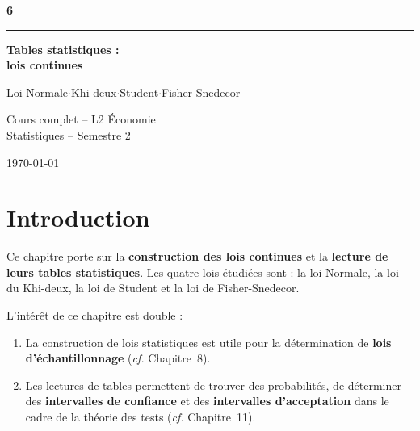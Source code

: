 \documentclass[11pt,a4paper]{article}
\begin{document}
\thispagestyle{empty}
\begin{center}
\vspace*{4cm}

{\fontsize{72}{80}\selectfont\sffamily\bfseries\color{deepblue}6}

\vspace{0.5cm}
{\color{lightblue}\rule{8cm}{2pt}}
\vspace{0.6cm}

{\LARGE\sffamily\bfseries\color{deepblue}Tables statistiques :}\\[0.3cm]
{\LARGE\sffamily\bfseries\color{deepblue}lois continues}

\vspace{1.5cm}

{\large\sffamily\color{textlight}%
Loi Normale\quad$\cdot$\quad Khi-deux\quad$\cdot$\quad Student\quad$\cdot$\quad Fisher-Snedecor}

\vspace{2.5cm}

{\sffamily\color{textlight}Cours complet -- L2 \'Economie\\[0.3cm]
Statistiques -- Semestre 2}

\vfill

{\small\sffamily\color{textlight}\today}
\end{center}

\newpage

\thispagestyle{empty}
{\hypersetup{linkcolor=textmain}
\tableofcontents}
\newpage

\section*{Introduction}

Ce chapitre porte sur la \textbf{construction des lois continues} et la \textbf{lecture de leurs tables statistiques}. Les quatre lois \'etudi\'ees sont : la loi Normale, la loi du Khi-deux, la loi de Student et la loi de Fisher-Snedecor.

L'int\'er\^et de ce chapitre est double :
\begin{enumerate}
\item La construction de lois statistiques est utile pour la d\'etermination de \textbf{lois d'\'echantillonnage} (\textit{cf.} Chapitre~8).
\item Les lectures de tables permettent de trouver des probabilit\'es, de d\'eterminer des \textbf{intervalles de confiance} et des \textbf{intervalles d'acceptation} dans le cadre de la th\'eorie des tests (\textit{cf.} Chapitre~11).
\end{enumerate}
\end{document}

